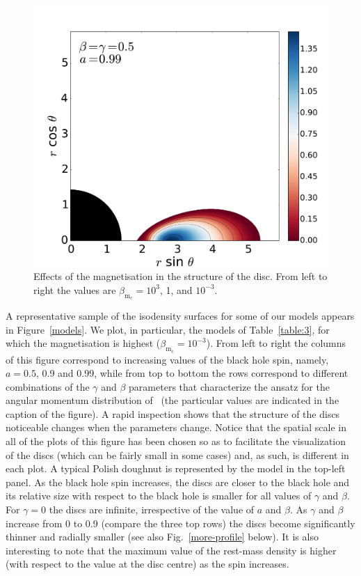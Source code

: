 \documentclass[referee]{aa}
\begin{document}
\begin{figure}[t]
\includegraphics[scale=0.14]{figures/fig3c.pdf}
\caption{Effects of the magnetisation in the structure of the disc. From left to right the values are $\beta_{\mathrm{m}_{\mathrm{c}}}
=10^3$, 1, and $10^{-3}$.}
\label{magnetisation}%
\end{figure}

A representative sample of the isodensity surfaces for some of our models appears in Figure~\ref{models}. We plot, in particular, the models of Table~\ref{table:3}, for which the magnetisation is highest ($\beta_{\mathrm{m}_{\mathrm{c}}}=10^{-3}$). From left to right the columns of this figure correspond to increasing values of the black hole spin, namely, $a=0.5$, 0.9 and 0.99, while from top to bottom the rows correspond to different combinations of the $\gamma$ and $\beta$ parameters that characterize the ansatz for the angular momentum distribution of~\citet{Qian:2009} (the particular values are indicated in the caption of the figure).  A rapid inspection shows that the structure of the discs noticeable changes when the parameters change. Notice that the spatial scale in all of the plots of this figure has been chosen so as to facilitate the visualization of the discs (which can be fairly small in some cases) and, as such, is different in each plot. A typical Polish doughnut is represented by the model in the top-left panel. As the black hole spin increases, the discs are closer to the black hole and its relative size with respect to the black hole is smaller for all values of $\gamma$ and $\beta$. For $\gamma=0$ the discs are infinite, irrespective of the value of $a$ and $\beta$. As $\gamma$ and $\beta$ increase from 0 to 0.9 (compare the three top rows) the discs become significantly thinner and radially smaller (see also Fig.~\ref{more-profile} below). It is also interesting to note that the maximum value of the rest-mass density is higher (with respect to the value at the disc centre) as the spin increases.
\end{document}

